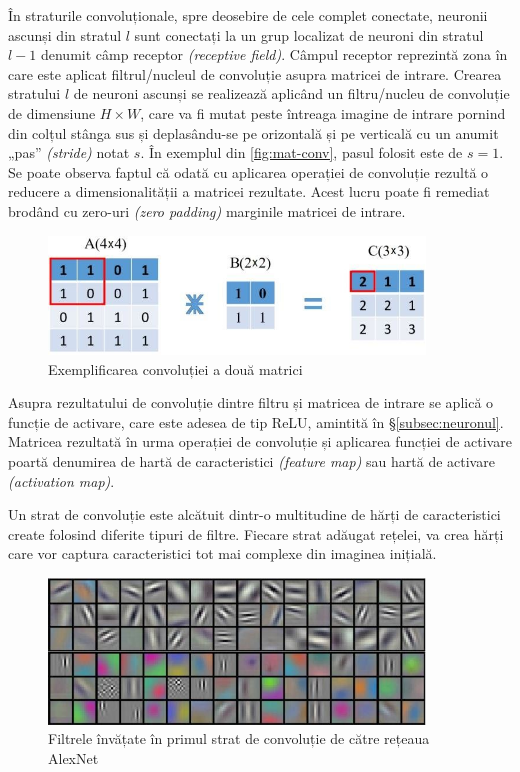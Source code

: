 În straturile convoluționale, spre deosebire de cele complet conectate, neuronii ascunși din stratul $l$ sunt conectați la un grup localizat de neuroni din stratul $l-1$ denumit câmp receptor \textit{(receptive field)}. Câmpul receptor reprezintă zona în care este aplicat filtrul/nucleul de convoluție asupra matricei de intrare. Crearea stratului $l$ de neuroni ascunși se realizează aplicând un filtru/nucleu de convoluție de dimensiune $H\times W$, care va fi mutat peste întreaga imagine de intrare pornind din colțul stânga sus și deplasându-se pe orizontală și pe verticală cu un anumit „pas” \textit{(stride)} notat $s$. În exemplul din \autoref{fig:mat-conv}, pasul folosit este de $s=1$. Se poate observa faptul că odată cu aplicarea operației de convoluție rezultă o reducere a dimensionalității a matricei rezultate. Acest lucru poate fi remediat brodând cu zero-uri \textit{(zero padding)} marginile matricei de intrare.
\begin{figure}[ht]
\centering
\includegraphics[width=10cm, keepaspectratio]{fig/cap2/conv-op.jpg}
\caption{Exemplificarea convoluției a două matrici \cite{vrejoiu:2019}}
\label{fig:mat-conv}
\end{figure}

Asupra rezultatului de convoluție dintre filtru și matricea de intrare se aplică o funcție de activare, care este adesea de tip ReLU, amintită în \S\ref{subsec:neuronul}. Matricea rezultată în urma operației de convoluție și aplicarea funcției de activare poartă denumirea de hartă de caracteristici \textit{(feature map)} sau hartă de activare \textit{(activation map)}.

Un strat de convoluție este alcătuit dintr-o multitudine de hărți de caracteristici create folosind diferite tipuri de filtre. Fiecare strat adăugat rețelei, va crea hărți care vor captura caracteristici tot mai complexe din imaginea inițială.
\begin{figure}[ht]
\centering
\includegraphics[width=10cm, keepaspectratio]{fig/cap2/alexnet-filters.jpg}
\caption{Filtrele învățate în primul strat de convoluție de către rețeaua AlexNet \cite{alexnet:2012}}
\label{fig:alexnet-filters}
\end{figure}

